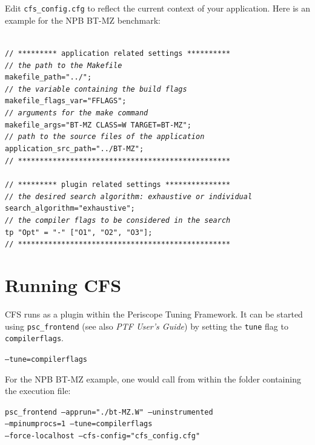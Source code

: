 \documentclass[11pt,a4paper, oneside]{book} %
\newenvironment{code}%
{
\addtolength{\leftskip}{0.5cm}}%
{

}
\begin{document}
Edit \texttt{cfs\_config.cfg} to reflect the current context of your application. Here is an example for the NPB BT-MZ benchmark:

\begin{code}
\texttt{\\
// ********* application related settings **********  \\
\textit{// the path to the Makefile} \\
makefile\_path="../"; \\
\textit{// the variable containing the build flags} \\
makefile\_flags\_var="FFLAGS"; \\
\textit{// arguments for the make command} \\
makefile\_args="BT-MZ CLASS=W TARGET=BT-MZ"; \\
\textit{// path to the source files of the application} \\
application\_src\_path="../BT-MZ"; \\
// ************************************************* \\
 \\
// ********* plugin related settings *************** \\
\textit{// the desired search algorithm: exhaustive or individual} \\
search\_algorithm="exhaustive"; \\
\textit{// the compiler flags to be considered in the search} \\
tp "Opt" = "-" ["O1", "O2", "O3"]; \\
// ************************************************* }
\end{code}

\section{Running CFS}
CFS runs as a plugin within the Periscope Tuning Framework. It can be started using \texttt{psc\_frontend} (see also \textit{PTF User's Guide}) by setting the \texttt{tune} flag to \texttt{compilerflags}.
\begin{center}
\texttt{--tune=compilerflags}
\end{center}

For the NPB BT-MZ example, one would call from within the folder containing the execution file:
\vspace*{0.5cm}

\begin{center}
\begin{minipage}{0.8\textwidth}
\texttt{psc\_frontend --apprun="./bt-MZ.W" --uninstrumented \\
--mpinumprocs=1 --tune=compilerflags \\
--force-localhost --cfs-config="cfs\_config.cfg"}
\end{minipage}
\end{center}
\end{document}
